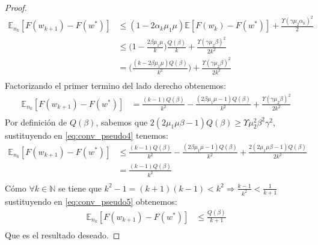 \documentclass{book}
\theoremstyle{plain}
\theoremstyle{definition}
\theoremstyle{remark}
\begin{document}
\begin{proof}
\begin{equation}\label{eq:conv_pseudo4}
\begin{split}
       \mathbb{E}_{n_k}[F(w_{k+1}) - F(w^*)]
       & \leq (1-2\alpha_k\mu_1\mu)\mathbb{E}[F(w_{k})- F(w^*)] +\frac{\Upsilon(\gamma\mu_2\alpha_k)^2}{2}\\
       & \leq \bigg(1-\frac{2\beta\mu_1\mu}{k}\bigg)\frac{Q(\beta)}{k}+\frac{\Upsilon(\gamma\mu_2\beta)^2}{2k^2}\\
       & = \bigg(\frac{(k - 2\beta\mu_1\mu)Q(\beta)}{k^2}\bigg)+\frac{\Upsilon(\gamma\mu_2\beta)^2}{2k^2}\\
\end{split}
\end{equation}
Factorizando el primer termino del lado derecho obtenemos:
\begin{equation}\label{eq:conv_pseudo4}
\begin{split}
       \mathbb{E}_{n_k}[F(w_{k+1}) - F(w^*)]
       & = \frac{(k-1)Q(\beta)}{k^2} - \frac{(2\beta\mu_1\mu- 1)Q(\beta)}{k^2}+\frac{\Upsilon(\gamma\mu_2\beta)^2}{2k^2}\\
\end{split}
\end{equation}
Por definición de $Q(\beta)$, sabemos que $2(2\mu_1\mu\beta-1)Q(\beta)\geq\Upsilon\mu_2^2\beta^2\gamma^2$, sustituyendo en \ref{eq:conv_pseudo4} tenemos:
\begin{equation}\label{eq:conv_pseudo5}
\begin{split}
       \mathbb{E}_{n_k}[F(w_{k+1}) - F(w^*)]
       & \leq \frac{(k-1)Q(\beta)}{k^2} - \frac{(2\beta\mu_1\mu- 1)Q(\beta)}{k^2}+\frac{2(2\mu_1\mu\beta-1)Q(\beta)}{2k^2}\\
       & = \frac{(k-1)Q(\beta)}{k^2} \\
\end{split}
\end{equation}
Cómo $\forall k \in \mathbb{N}$ se tiene que $k^2 - 1 = (k+1)(k-1)< k^2 \Rightarrow \frac{k-1}{k^2} < \frac{1}{k+1}$ sustituyendo en \ref{eq:conv_pseudo5} obtenemos:
\begin{equation}\label{eq:conv_pseudo5}
\begin{split}
       \mathbb{E}_{n_k}[F(w_{k+1}) - F(w^*)]
       & \leq  \frac{Q(\beta)}{k+1} \\
\end{split}
\end{equation}
Que es el resultado deseado.
\end{proof}
\end{document}
